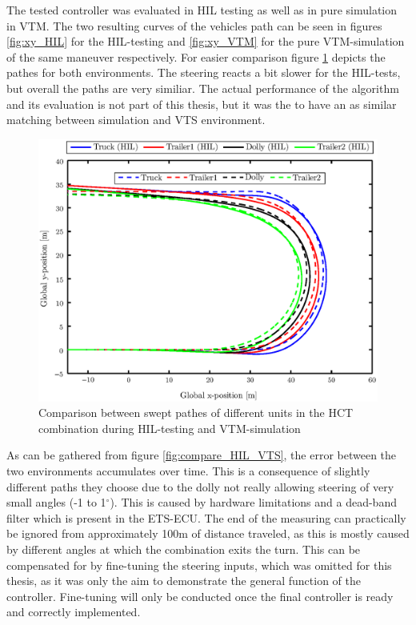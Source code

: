 \documentclass[ExampleMasters.tex]{subfiles}
\begin{document}
The tested controller was evaluated in \gls{HIL} testing as well as in pure simulation in \gls{VTM}. The two resulting curves of the vehicles path can be seen in figures \ref{fig:xy_HIL} for the \gls{HIL}-testing and \ref{fig:xy_VTM} for the pure \gls{VTM}-simulation of the same maneuver respectively. For easier comparison figure \ref{fig:xy_HIL_and_VTM} depicts the pathes for both environments. The steering reacts a bit slower for the \gls{HIL}-tests, but overall the paths are very similiar. The actual performance of the algorithm and its evaluation is not part of this thesis, but it was the to have an as similar matching between simulation and \gls{VTS} environment.


\begin{figure}[!htb]
	\centering
	\includegraphics[width=1\linewidth]{figures/xy_HIL_and_VTM}
	\caption{Comparison between swept pathes of different units in the \gls{HCT} combination during \gls{HIL}-testing and \gls{VTM}-simulation}
	
	\label{fig:xy_HIL_and_VTM}
\end{figure}

As can be gathered from figure \ref{fig:compare_HIL_VTS}, the error between the two environments accumulates over time. This is a consequence of slightly different paths they choose due to the dolly not really allowing steering of very small angles (-1 to 1$^\circ$). This is caused by hardware limitations and a dead-band filter which is present in the \gls{ETS}-\gls{ECU}. The end of the measuring can practically be ignored from approximately 100m of distance traveled, as this is mostly caused by different angles at which the combination exits the turn. This can be compensated for by fine-tuning the steering inputs, which was omitted for this thesis, as it was only the aim to demonstrate the general function of the controller. Fine-tuning will only be conducted once the final controller is ready and correctly implemented. 
\end{document}
